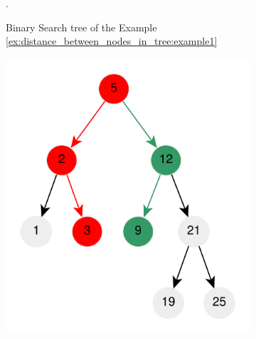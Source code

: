 \begin{figure}
\begin{subfigure}[b]{0.3\textwidth}
		\caption{Binary Search tree of the Example
		\ref{ex:distance_between_nodes_in_tree:example1}}.
		\label{fig:distance_between_nodes_in_tree:example1}
	\end{subfigure}
	\centering
	\begin{subfigure}[b]{0.3\textwidth}
		\centering
		\includegraphics[width=\textwidth]{sources/distance_between_nodes_in_tree/images/example3}
		\caption{}
		\label{fig:distance_between_nodes_in_tree:example3}
	\end{subfigure}
	\hfill
	\begin{subfigure}[b]{0.3\textwidth}
		\centering

\end{subfigure}
\end{figure}
